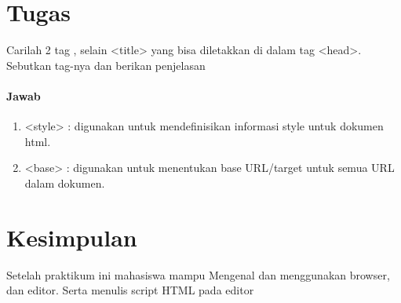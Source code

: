 \documentclass[a4paper,12pt]{article}
\begin{document}
\section{Tugas}
Carilah 2 tag , selain  <title> yang bisa diletakkan di dalam tag <head>. Sebutkan tag-nya dan berikan penjelasan\\

\paragraph{Jawab\\}
\begin{enumerate}
    \item <style> : digunakan untuk mendefinisikan informasi style untuk dokumen html.
    \item <base> : digunakan untuk menentukan base URL/target untuk semua URL dalam dokumen.
\end{enumerate}

\section{Kesimpulan}
Setelah praktikum ini mahasiswa mampu Mengenal dan menggunakan browser, dan editor. Serta menulis script HTML pada editor
\end{document}
